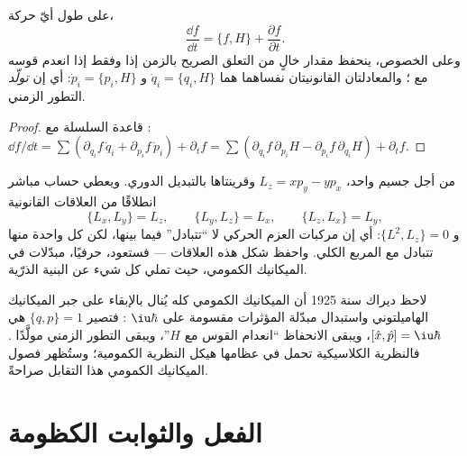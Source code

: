 \begin{theorem}\label{thm:b3:hamiltonian-mechanics:evolution}
على طول أيّ حركة،
\[
\frac{\dd f}{\dd t} = \{f, H\} + \frac{\partial f}{\partial t} .
\]
وعلى الخصوص، ينحفظ مقدار خالٍ من التعلق الصريح بالزمن إذا وفقط
إذا انعدم قوسه مع ؛ والمعادلتان القانونيتان نفساهما
هما $\dot q_i = \{q_i, H\}$ و $\dot p_i
= \{p_i, H\}$: أي إن  \emph{تولّد} التطور الزمني.
\end{theorem}

\begin{proof}
قاعدة السلسلة مع : $\dd f/\dd t = \sum(
\partial_{q_i}f\,\dot q_i + \partial_{p_i}f\,\dot p_i) + \partial_tf =
\sum(\partial_{q_i}f\,\partial_{p_i}H - \partial_{p_i}f\,
\partial_{q_i}H) + \partial_tf$.
\end{proof}

\begin{example}\label{ex:b3:hamiltonian-mechanics:brackets}
من أجل جسيم واحد، $L_z = xp_y - yp_x$ وقرينتاها بالتبديل الدوري.
ويعطي حساب مباشر انطلاقًا من العلاقات القانونية
\[
\{L_x, L_y\} = L_z , \qquad
\{L_y, L_z\} = L_x , \qquad
\{L_z, L_x\} = L_y ,
\]
و $\{L^2, L_z\} = 0$: أي إن مركبات العزم الحركي لا ``تتبادل''
فيما بينها، لكن كل واحدة منها تتبادل مع المربع الكلي. واحفظ شكل
هذه العلاقات --- فستعود، حرفيًا، مبدّلات في الميكانيك الكمومي،
حيث تملي كل شيء عن البنية الذرّية.
\end{example}

\begin{remark}\label{rem:b3:hamiltonian-mechanics:doorway}
لاحظ ديراك سنة 1925 أن الميكانيك الكمومي كله يُنال بالإبقاء على
جبر الميكانيك الهاميلتوني واستبدال مبدّلة المؤثرات مقسومة على
$\iu\hbar$ : فتصير $\{q, p\} = 1$ هي $[\hat x, \hat p] = \iu\hbar$،
ويبقى الانحفاظ ``انعدام القوس مع $H$''، ويبقى التطور الزمني
مولَّدًا . فالنظرية الكلاسيكية تحمل في عظامها هيكل
النظرية الكمومية؛ وستُظهر فصول الميكانيك الكمومي هذا التقابل
صراحةً.
\end{remark}

\section{الفعل والثوابت الكظومة}

